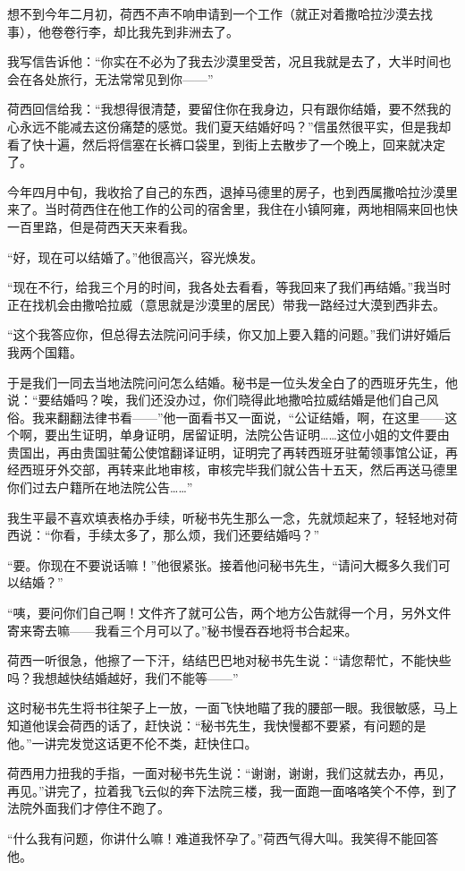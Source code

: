 \par 想不到今年二月初，荷西不声不响申请到一个工作（就正对着撒哈拉沙漠去找事），他卷卷行李，却比我先到非洲去了。
\par 我写信告诉他：“你实在不必为了我去沙漠里受苦，况且我就是去了，大半时间也会在各处旅行，无法常常见到你——”
\par 荷西回信给我：“我想得很清楚，要留住你在我身边，只有跟你结婚，要不然我的心永远不能减去这份痛楚的感觉。我们夏天结婚好吗？”信虽然很平实，但是我却看了快十遍，然后将信塞在长裤口袋里，到街上去散步了一个晚上，回来就决定了。
\par 今年四月中旬，我收拾了自己的东西，退掉马德里的房子，也到西属撒哈拉沙漠里来了。当时荷西住在他工作的公司的宿舍里，我住在小镇阿雍，两地相隔来回也快一百里路，但是荷西天天来看我。
\par “好，现在可以结婚了。”他很高兴，容光焕发。
\par “现在不行，给我三个月的时间，我各处去看看，等我回来了我们再结婚。”我当时正在找机会由撒哈拉威（意思就是沙漠里的居民）带我一路经过大漠到西非去。
\par “这个我答应你，但总得去法院问问手续，你又加上要入籍的问题。”我们讲好婚后我两个国籍。
\par 于是我们一同去当地法院问问怎么结婚。秘书是一位头发全白了的西班牙先生，他说：“要结婚吗？唉，我们还没办过，你们晓得此地撒哈拉威结婚是他们自己风俗。我来翻翻法律书看——”他一面看书又一面说，“公证结婚，啊，在这里——这个啊，要出生证明，单身证明，居留证明，法院公告证明……这位小姐的文件要由贵国出，再由贵国驻葡公使馆翻译证明，证明完了再转西班牙驻葡领事馆公证，再经西班牙外交部，再转来此地审核，审核完毕我们就公告十五天，然后再送马德里你们过去户籍所在地法院公告……”
\par 我生平最不喜欢填表格办手续，听秘书先生那么一念，先就烦起来了，轻轻地对荷西说：“你看，手续太多了，那么烦，我们还要结婚吗？”
\par “要。你现在不要说话嘛！”他很紧张。接着他问秘书先生，“请问大概多久我们可以结婚？”
\par “咦，要问你们自己啊！文件齐了就可公告，两个地方公告就得一个月，另外文件寄来寄去嘛——我看三个月可以了。”秘书慢吞吞地将书合起来。
\par 荷西一听很急，他擦了一下汗，结结巴巴地对秘书先生说：“请您帮忙，不能快些吗？我想越快结婚越好，我们不能等——”
\par 这时秘书先生将书往架子上一放，一面飞快地瞄了我的腰部一眼。我很敏感，马上知道他误会荷西的话了，赶快说：“秘书先生，我快慢都不要紧，有问题的是他。”一讲完发觉这话更不伦不类，赶快住口。
\par 荷西用力扭我的手指，一面对秘书先生说：“谢谢，谢谢，我们这就去办，再见，再见。”讲完了，拉着我飞云似的奔下法院三楼，我一面跑一面咯咯笑个不停，到了法院外面我们才停住不跑了。
\par “什么我有问题，你讲什么嘛！难道我怀孕了。”荷西气得大叫。我笑得不能回答他。

